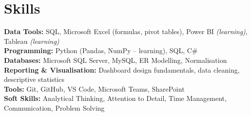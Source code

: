 \documentclass[10.5pt]{article}
\begin{document}
\section{Skills}
\textbf{Data Tools:} SQL, Microsoft Excel (formulas, pivot tables), Power BI \textit{(learning)}, Tableau \textit{(learning)} \\
\textbf{Programming:} Python (Pandas, NumPy -- learning), SQL, C\# \\
\textbf{Databases:} Microsoft SQL Server, MySQL, ER Modelling, Normalisation \\
\textbf{Reporting \& Visualisation:} Dashboard design fundamentals, data cleaning, descriptive statistics \\
\textbf{Tools:} Git, GitHub, VS Code, Microsoft Teams, SharePoint \\
\textbf{Soft Skills:} Analytical Thinking, Attention to Detail, Time Management, Communication, Problem Solving
\end{document}
